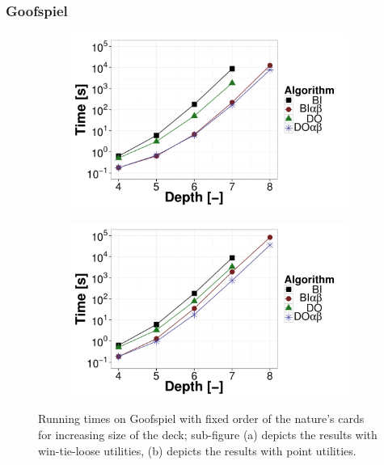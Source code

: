 \subsubsection{Goofspiel}
\begin{figure} [t]
\centering
	\begin{subfigure}{0.49\textwidth}
 		\includegraphics[width=1\textwidth]{figures/GS-BT-NF.pdf}\caption{}\label{fig:off:res:gs-bt}
 	\end{subfigure}
	\begin{subfigure}{0.49\textwidth}
 		\includegraphics[width=1\textwidth]{figures/GS-BF-NF.pdf}\caption{}\label{fig:off:res:gs-bf}
 	\end{subfigure}
\caption{Running times on Goofspiel with fixed order of the nature's cards for increasing size of the deck; sub-figure (a) depicts the results with win-tie-loose utilities, (b) depicts the results with point utilities.} \label{fig:off:res:gs}
\end{figure}

